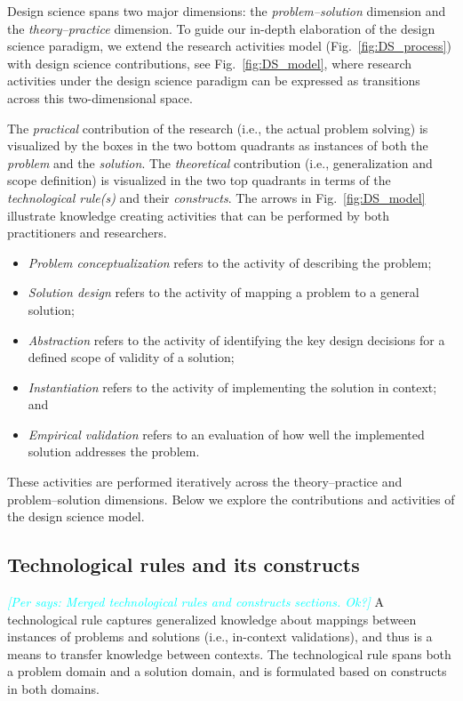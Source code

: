 \documentclass[graybox]{svmult}
\newcommand{\per}[1]{\textcolor{cyan}{{\it [Per says: #1]}}}
\newcommand{\per}[1]{}
\begin{document}
Design science spans two major dimensions: the \emph{problem--solution} dimension and the \emph{theory--practice} dimension. To guide our in-depth elaboration of the design science paradigm, we extend the research activities model (Fig.~\ref{fig:DS_process}) with design science contributions, see Fig.~\ref{fig:DS_model}, where research activities under the design science paradigm can be expressed as transitions across this two-dimensional space.

The \emph{practical} contribution of the research (i.e., the actual problem solving) is visualized by the boxes in the two bottom quadrants as instances of both the \emph{problem} and the \emph{solution}. The \emph{theoretical} contribution (i.e., generalization and scope definition) is visualized in the two top quadrants in terms of the \emph{technological rule(s)} and their \emph{constructs}. 
The arrows in Fig.~\ref{fig:DS_model} illustrate knowledge creating activities that can be performed by both practitioners and researchers. 
\begin{itemize}
\item \emph{Problem conceptualization} refers to the activity of describing the problem; %
\item \emph{Solution design} refers to the activity of mapping a problem to a general solution; 
\item \emph{Abstraction} refers to the activity of identifying the key design decisions for a defined scope of validity of a solution; 
\item \emph{Instantiation} refers to the activity of implementing the solution in context; and 
\item \emph{Empirical validation} refers to an evaluation of how well the implemented solution addresses the problem.
\end{itemize}

These activities are performed iteratively across the theory--practice and problem--solution dimensions. Below we explore the contributions and activities of the design science model. 

\subsection{Technological rules and its constructs}
\label{sec:technologicalrules}

\per{Merged technological rules and constructs sections. Ok?}
A technological rule captures generalized knowledge about mappings between instances of problems and solutions (i.e., in-context validations), and thus is a means to transfer knowledge between contexts. The technological rule spans both a problem domain and a solution domain, and is formulated based on constructs in both domains. 
\end{document}
